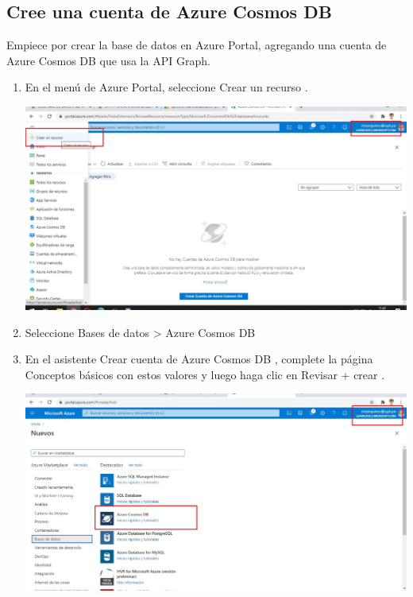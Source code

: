 \documentclass[12pt,letterpaper]{article}
\begin{document}
	\subsection{Cree una cuenta de Azure Cosmos DB}
	
\item	Empiece por crear la base de datos en Azure Portal, agregando una cuenta de Azure Cosmos DB que usa la API Graph.
	\begin{enumerate}
		
		\item En el menú de Azure Portal, seleccione Crear un recurso .
		\begin{center}
			\includegraphics[width=14cm]{./img/1.1.jpg} 
		\end{center}
	
		\item Seleccione Bases de datos > Azure Cosmos DB
		
		\item En el asistente Crear cuenta de Azure Cosmos DB , complete la página Conceptos básicos con estos valores y luego haga clic en Revisar + crear .
		
		\begin{center}
			\includegraphics[width=14cm]{./img/1.2.jpg} 
		\end{center}
		

\end{enumerate}
\end{document}

